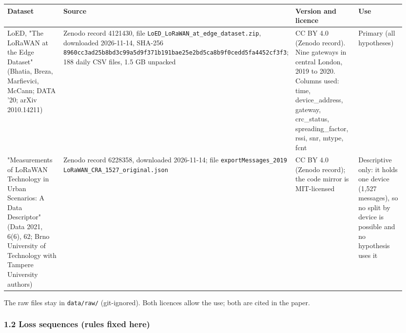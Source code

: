 {\scriptsize\raggedright
\begin{longtable}{p{0.237\linewidth}p{0.237\linewidth}p{0.237\linewidth}p{0.237\linewidth}}
\toprule
Dataset & Source & Version and licence & Use \\
\midrule
\endhead
LoED, "The LoRaWAN at the Edge Dataset" (Bhatia, Breza, Marfievici, McCann; DATA '20; arXiv 2010.14211) & Zenodo record 4121430, file \texttt{LoED\_LoRaWAN\_at\_edge\_dataset.zip}, downloaded 2026-11-14, SHA-256 \texttt{8960cc3ad25b8bd3c99a5d9f371b191bae25e2bd5ca8b9f0cedd5fa4452cf3f3}; 188 daily CSV files, 1.5 GB unpacked & CC BY 4.0 (Zenodo record). Nine gateways in central London, 2019 to 2020. Columns used: time, device\_address, gateway, crc\_status, spreading\_factor, rssi, snr, mtype, fcnt & Primary (all hypotheses) \\
"Measurements of LoRaWAN Technology in Urban Scenarios: A Data Descriptor" (Data 2021, 6(6), 62; Brno University of Technology with Tampere University authors) & Zenodo record 6228358, downloaded 2026-11-14; file \texttt{exportMessages\_2019 LoRaWAN\_CRA\_1527\_original.json} & CC BY 4.0 (Zenodo record); the code mirror is MIT-licensed & Descriptive only: it holds one device (1,527 messages), so no split by device is possible and no hypothesis uses it \\
\bottomrule
\end{longtable}}

The raw files stay in \texttt{data/raw/} (git-ignored). Both licences allow the use; both are cited in the paper.

\subsubsection*{1.2 Loss sequences (rules fixed here)}

